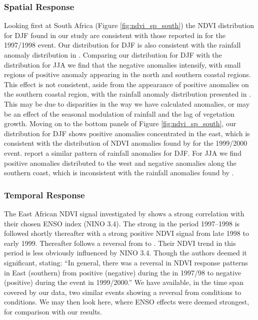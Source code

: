 \subsubsection{Spatial Response}
Looking first at South Africa (Figure \ref{fig:ndvi_sp_south}) the
NDVI distribution for DJF \elnino{} found in our study are consistent
with those reported in \cite{anyamba2002} for the 1997/1998 \elnino{}
event. Our distribution for DJF \elnino{} is also consistent with the
rainfall anomaly distribution in \cite{deoliveira2018}. Comparing our
distribution for DJF \elnino{} with the distribution for JJA \elnino{}
we find that the negative anomalies intensify, with small regions of
positive anomaly appearing in the north and southern coastal
regions. This effect is not consistent, aside from the appearance of
positive anomalies on the southern coastal region, with the rainfall
anomaly distribution presented in \cite{deoliveira2018}. This may be
due to disparities in the way we have calculated anomalies, or may be
an effect of the seasonal modulation of rainfall and the lag of
vegetation growth. Moving on to the bottom panels of Figure
\ref{fig:ndvi_sp_south}, our distribution for DJF \nina{} shows
positive anomalies concentrated in the east, which is consistent with
the distribution of NDVI anomalies found by \cite{anyamba2002} for the
1999/2000 \nina{} event. \cite{deoliveira2018} report a similar
pattern of rainfall anomalies for DJF. For JJA we find positive
anomalies distributed to the west and negative anomalies along the
southern coast, which is inconsistent with the rainfall anomalies
found by \cite{deoliveira2018}.

\subsubsection{Temporal Response}

The East African NDVI signal investigated by \cite{anyamba2002} shows a strong
correlation with their chosen ENSO index (NINO 3.4). The strong \elnino{} in the
period 1997--1998 is followed shortly thereafter with a strong positive NDVI
signal from late 1998 to early 1999. Thereafter follows a reversal from
\elnino{} to \nina{}. Their NDVI trend in this period is less obviously
influenced by NINO 3.4. Though the authors deemed it significant, stating: ``In
general, there was a reversal in NDVI response patterns in East (southern) from
positive (negative) during the \elnino{} in 1997/98 to negative (positive)
during the \nina{} event in 1999/2000.'' We have available, in the time span
covered by our data, two similar events showing a reversal from \elnino{}
conditions to \nina{} conditions. We may then look here, where ENSO effects were
deemed strongest, for comparison with our results.


